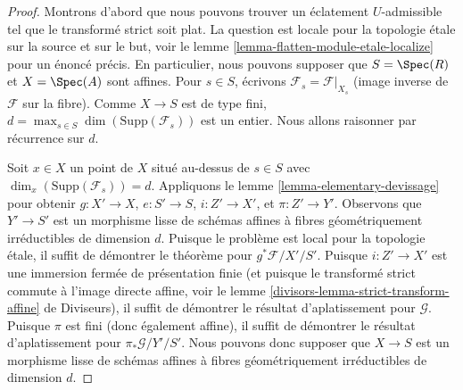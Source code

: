 \begin{proof}
Montrons d'abord que nous pouvons trouver un éclatement $U$-admissible tel que le
transformé strict soit plat. La question est locale pour la topologie \'etale sur la source
et sur le but, voir le
lemme \ref{lemma-flatten-module-etale-localize} pour un énoncé précis.
En particulier, nous pouvons supposer que $S = \Spec(R)$ et $X = \Spec(A)$
sont affines. Pour $s \in S$, écrivons $\mathcal{F}_s = \mathcal{F}|_{X_s}$
(image inverse de $\mathcal{F}$ sur la fibre). Comme $X \to S$ est de type fini,
$d = \max_{s \in S} \dim(\text{Supp}(\mathcal{F}_s))$
est un entier. Nous allons raisonner par récurrence sur $d$.

\medskip\noindent
Soit $x \in X$ un point de $X$ situé au-dessus de $s \in S$ avec
$\dim_x(\text{Supp}(\mathcal{F}_s)) = d$.
Appliquons le lemme \ref{lemma-elementary-devissage} pour obtenir
$g : X' \to X$, $e : S' \to S$, $i : Z' \to X'$, et $\pi : Z' \to Y'$.
Observons que $Y' \to S'$ est
un morphisme lisse de schémas affines à fibres géométriquement irréductibles
de dimension $d$. Puisque le problème est local pour la topologie \'etale, il suffit
de démontrer le théorème pour $g^*\mathcal{F}/X'/S'$. Puisque $i : Z' \to X'$
est une immersion fermée de présentation finie (et puisque le transformé strict
commute à l'image directe affine, voir le
lemme \ref{divisors-lemma-strict-transform-affine} de Diviseurs),
il suffit de démontrer le résultat d'aplatissement pour $\mathcal{G}$.
Puisque $\pi$ est fini (donc également affine), il suffit de démontrer le
résultat d'aplatissement pour $\pi_*\mathcal{G}/Y'/S'$. Nous pouvons donc supposer
que $X \to S$ est un morphisme lisse de schémas affines à fibres
géométriquement irréductibles de dimension $d$.


\end{proof}

